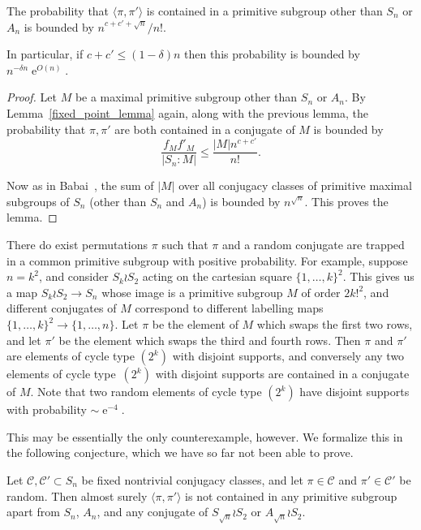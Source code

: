 \documentclass[ALCO,ThmDefs,Unicode,epreuves]{cedram}
\DeclareMathOperator{\expe}{e}
\newcommand\calC{\mathcal{C}}
\begin{document}
\begin{lemma} \label{lem:primitive-case}
The probability that $\langle \pi, \pi'\rangle$ is contained in a primitive subgroup other than $S_n$ or $A_n$ is bounded by $n^{c + c' + \sqrt{n}}/n!$.

In particular, if $c+c' \leq (1- \delta)n$ then this probability is bounded by $n^{-\delta n} \expe^{O(n)}$.
\end{lemma}
\begin{proof}
Let $M$ be a maximal primitive subgroup other than $S_n$ or $A_n$. By Lemma~\ref{fixed_point_lemma} again, along with the previous lemma, the probability that $\pi, \pi'$ are both contained in a conjugate of $M$ is bounded by
\[
 \frac{f_M f'_M}{|S_n : M|} \leq \frac{|M| n^{c + c'}}{n!}.
\]

Now as in Babai~\cite[Lemma~2.5 and the proof of Theorem~1.4]{babai_prob_gen}, the sum of $|M|$ over all conjugacy classes of primitive maximal subgroups of $S_n$ (other than $S_n$ and $A_n$) is bounded by $n^{\sqrt{n}}$. This proves the lemma.
\end{proof}

\begin{rema}
There do exist permutations $\pi$ such that $\pi$ and a random conjugate are trapped in a common primitive subgroup with positive probability. For example, suppose $n = k^2$, and consider $S_k \wr S_2$ acting on the cartesian square $\{1, \dots, k\}^2$. This gives us a map $S_k \wr S_2 \to S_n$ whose image is a primitive subgroup $M$ of order $2 k!^2$, and different conjugates of $M$ correspond to different labelling maps $\{1, \dots, k\}^2 \to \{1, \dots, n\}$. Let $\pi$ be the element of $M$ which swaps the first two rows, and let $\pi'$ be the element which swaps the third and fourth rows. Then $\pi$ and $\pi'$ are elements of cycle type $(2^k)$ with disjoint supports, and conversely any two elements of cycle type~$(2^k)$ with disjoint supports are contained in a conjugate of $M$. Note that two random elements of cycle type $(2^k)$ have disjoint supports with probability $\sim \expe^{-4}$.

This may be essentially the only counterexample, however. We formalize this in the following conjecture, which we have so far not been able to prove.
\end{rema}

\begin{conjecture}
Let $\calC, \calC'\subset S_n$ be fixed nontrivial conjugacy classes, and let $\pi\in\calC$ and $\pi'\in\calC'$ be random. Then almost surely $\langle \pi, \pi'\rangle$ is not contained in any primitive subgroup apart from $S_n$, $A_n$, and any conjugate of $S_{\sqrt{n}} \wr S_2$ or $A_{\sqrt{n}} \wr S_2$.
\end{conjecture}
\end{document}
